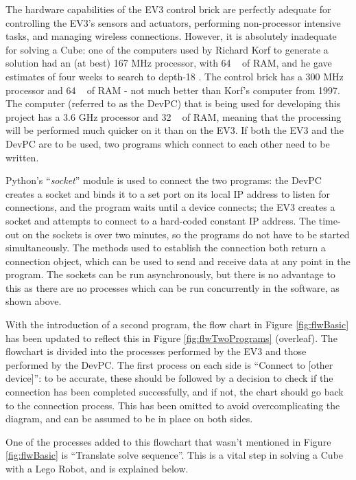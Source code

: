 \documentclass{report}
\newcommand{\tit}[1]{\textit{#1}}
\newcommand{\propernoun}[1]{\enquote{\tit{#1}}}
\newcommand{\depth}[1]{depth-#1}
\begin{document}
    The hardware capabilities of the EV3 control brick are perfectly adequate for controlling the EV3's sensors and actuators, performing non-processor intensive tasks, and managing wireless connections. However, it is absolutely inadequate for solving a Cube: one of the computers used by Richard Korf to generate a solution had an (at best) 167 \si{\mega\hertz} processor, with 64 \si{\mega\byte} of RAM, and he gave estimates of four weeks to search to \depth{18} \cite{Korf1997}. The control brick has a 300 \si{\mega\hertz} processor and 64 \si{\mega\byte} of RAM - not much better than Korf's computer from 1997. The computer (referred to as the DevPC) that is being used for developing this project has a 3.6 \si{\giga\hertz} processor and 32 \si{\giga\byte} of RAM, meaning that the processing will be performed much quicker on it than on the EV3. If both the EV3 and the DevPC are to be used, two programs which connect to each other need to be written.
    
    Python's \propernoun{socket} module is used to connect the two programs: the DevPC creates a socket and binds it to a set port on its local IP address to listen for connections, and the program waits until a device connects; the EV3 creates a socket and attempts to connect to a hard-coded constant IP address. The time-out on the sockets is over two minutes, so the programs do not have to be started simultaneously. The methods used to establish the connection both return a connection object, which can be used to send and receive data at any point in the program. The sockets can be run asynchronously, but there is no advantage to this as there are no processes which can be run concurrently in the software, as shown above.
    
    With the introduction of a second program, the flow chart in Figure \ref{fig:flwBasic} has been updated to reflect this in Figure \ref{fig:flwTwoPrograms} (overleaf). The flowchart is divided into the processes performed by the EV3 and those performed by the DevPC. The first process on each side is \enquote{Connect to [other device]}: to be accurate, these should be followed by a decision to check if the connection has been completed successfully, and if not, the chart should go back to the connection process. This has been omitted to avoid overcomplicating the diagram, and can be assumed to be in place on both sides.
    
    One of the processes added to this flowchart that wasn't mentioned in Figure \ref{fig:flwBasic} is \enquote{Translate solve sequence}. This is a vital step in solving a Cube with a Lego Robot, and is explained below.
    
\end{document}
